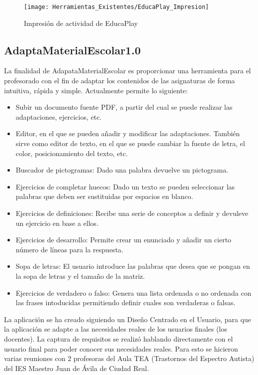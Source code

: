 \begin{figure}
    \centering
    \texttt{[image: Herramientas\_Existentes/EducaPlay\_Impresion]}
    \caption{Impresión de actividad de EducaPlay}
    \label{fig:EducaPlay_Impresion}
\end{figure}

\subsection{AdaptaMaterialEscolar1.0}
\label{cap:adaptaMaterial}
La finalidad de AdapataMaterialEscolar es proporcionar una herramienta para el profesorado con el fin de adaptar los contenidos de las asignaturas de forma intuitiva, rápida y simple. Actualmente permite lo siguiente:
\begin{itemize}
    \item Subir un documento fuente PDF, a partir del cual se puede realizar las adaptaciones, ejercicios, etc.
    \item Editor, en el que se pueden añadir y modificar las adaptaciones. También sirve como editor de texto, en el que se puede cambiar la fuente de letra, el color, posicionamiento del texto, etc.
    \item Buscador de pictogramas: Dado una palabra devuelve un pictograma.
    \item Ejercicios de completar huecos: Dado un texto se pueden seleccionar las palabras que deben ser sustituidas por espacios en blanco.
    \item Ejercicios de definiciones: Recibe una serie de conceptos a definir y devuleve un ejercicio en base a ellos.
    \item Ejercicios de desarrollo: Permite crear un enunciado y añadir un cierto número de líneas para la respuesta.
    \item Sopa de letras: El usuario introduce las palabras que desea que se pongan en la sopa de letras y el tamaño de la matriz.
    \item Ejercicios de verdadero o falso: Genera una lista ordenada o no ordenada con las frases intoducidas permitiendo definir cuales son verdaderas o falsas.
\end{itemize}

La aplicación se ha creado siguiendo un Diseño Centrado en el Usuario, para que la aplicación se adapte a las necesidades reales de los usuarios finales (los docentes). La captura de requisitos se realizó hablando directamente con el usuario final para poder conocer sus necesidades reales. Para esto se hicieron varias reuniones con 2 profesoras del Aula TEA (Trastornos del Espectro Autista) del IES Maestro Juan de Ávila de Ciudad Real.

